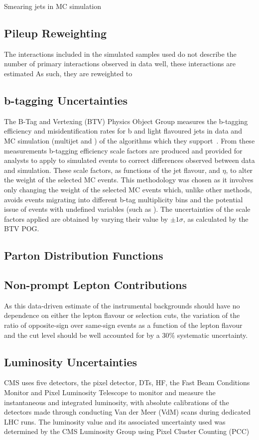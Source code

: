 Smearing jets in MC simulation 

\subsection{Pileup Reweighting}
The \PU interactions included in the simulated samples used do not describe the number of primary interactions observed in data well, these interactions are estimated 
As such, they are reweighted to 

\subsection{b-tagging Uncertainties}
The B-Tag and Vertexing (BTV) Physics Object Group measures the b-tagging efficiency and misidentification rates for b and light flavoured jets in data and MC simulation (multijet and \ttbar) of the algorithms which they support~\cite{Sirunyan:2017ezt}.
From these measurements b-tagging efficiency scale factors are produced and provided for analysts to apply to simulated events to correct differences observed between data and simulation.
These scale factors, as functions of the jet flavour, \pT and $\eta$, to alter the weight of the selected MC events.
This methodology was chosen as it involves only changing the weight of the selected MC events which, unlike other methods, avoids events migrating into different b-tag multiplicity bins and the potential issue of events with undefined variables (such as ).
The uncertainties of the scale factors applied are obtained by varying their value by $\pm 1\sigma$, as calculated by the BTV POG. 

\subsection{Parton Distribution Functions}
\subsection{Non-prompt Lepton Contributions}
As this data-driven estimate of the instrumental backgrounds should have no dependence on either the lepton flavour or selection cuts, the variation of the ratio of opposite-sign over same-sign events as a function of the lepton flavour and the cut level should be well accounted for by a 30\% systematic uncertainty.

\subsection{Luminosity Uncertainties}
CMS uses five detectors, the pixel detector, DTs, HF, the Fast Beam Conditions Monitor and Pixel Luminosity Telescope to monitor and measure the instantaneous and integrated luminosity, with absolute calibrations of the detectors made through conducting Van der Meer (VdM) scans during dedicated LHC runs.
The luminosity value and its associated uncertainty used was determined by the CMS Luminosity Group using 
Pixel Cluster Counting (PCC) 

